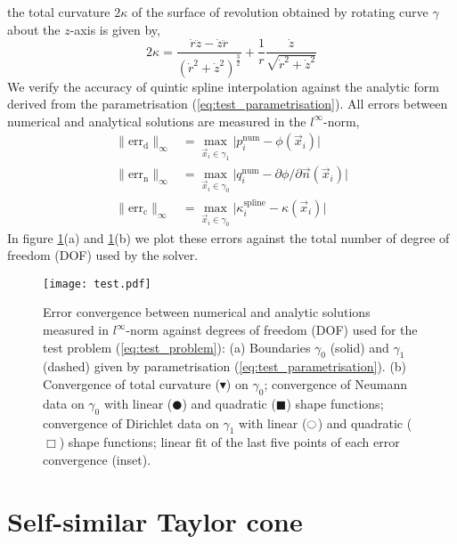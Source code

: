 \documentclass{jfm}
\begin{document}
the total curvature $2\kappa$ of the surface of revolution obtained by rotating curve $\gamma$
about the $z$-axis is given by,
\begin{equation}
2\kappa= \frac{\dot{r}\ddot{z} - \dot{z}\ddot{r}}{(\dot{r}^2+\dot{z}^2)^{\frac{3}{2}}}
+\frac{1}{r}\frac{\dot{z}}{\sqrt{\dot{r}^2+\dot{z}^2}}
\end{equation}
We verify the accuracy of quintic spline interpolation against the analytic form derived from
the parametrisation (\ref{eq:test_parametrisation}). All errors between numerical and analytical solutions
are measured in the $l^\infty$-norm,
\begin{align}
\|\textrm{err}_\mathrm{d}\|_\infty &= 
\max_{\vec{x}_i\in \gamma_1}{\lvert p^\mathrm{num}_i-\phi(\vec{x}_i)\rvert}\\
\|\textrm{err}_\mathrm{n}\|_\infty &= 
\max_{\vec{x}_i\in \gamma_0}{\lvert q^\mathrm{num}_i-\partial\phi/\partial\vec{n}(\vec{x}_i)\rvert}\\
\|\textrm{err}_\mathrm{c}\|_\infty &= 
\max_{\vec{x}_i\in \gamma_0}{\lvert \kappa^\mathrm{spline}_i-\kappa(\vec{x}_i)\rvert}
\end{align}
In figure \ref{fig:test_result}(a) and \ref{fig:test_result}(b) 
we plot these errors against the total number of degree of freedom (DOF) used by the solver.
\begin{figure}
  \centering
  \texttt{[image: test.pdf]}%
  \caption{
Error convergence  between numerical and analytic solutions measured in $l^\infty$-norm against degrees of freedom (DOF) used for the test problem (\ref{eq:test_problem}):
(a) Boundaries $\gamma_0$ (solid) and $\gamma_1$ (dashed) given by parametrisation (\ref{eq:test_parametrisation}).
(b) Convergence of total curvature ($\blacktriangledown$) on $\gamma_0$;
convergence of Neumann data on $\gamma_0$ with linear ($\CIRCLE $) and quadratic ($\blacksquare$) shape functions;
convergence of Dirichlet data on $\gamma_1$ with linear ($\ocircle $) and quadratic ($\Box$) shape functions;
linear fit of the last five points of each error convergence (inset).
  }
\label{fig:test_result}
\end{figure}

\section{Self-similar Taylor cone}
\end{document}

